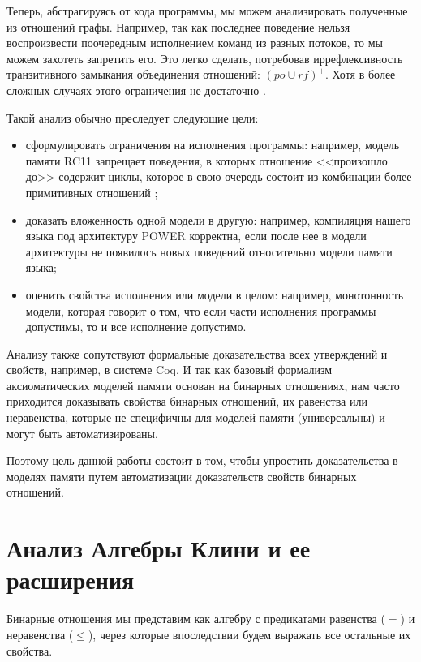 \documentclass[times
              ,specification
              ,annotation
              ]{itmo-student-thesis}
\begin{document}
  Теперь, абстрагируясь от кода программы, мы можем анализировать полученные из отношений
  графы. Например, так как последнее поведение нельзя воспроизвести поочередным исполнением команд из
  разных потоков, то мы можем захотеть запретить его.
  Это легко сделать, потребовав иррефлексивность транзитивного замыкания
  объединения отношений: $ (\textit{po} \cup \textit{rf})^+ $.
  Хотя в более сложных случаях этого ограничения не достаточно \cite{rc11}.

  Такой анализ обычно преследует следующие цели:
  \begin{itemize}
    \item сформулировать ограничения на исполнения программы:
    например, модель памяти RC11 запрещает поведения, в которых отношение <<произошло до>> содержит
    циклы, которое в свою очередь состоит из комбинации более примитивных отношений \cite{rc11};
    \item доказать вложенность одной модели в другую:
    например, компиляция нашего языка под архитектуру POWER корректна, если после нее в модели
    архитектуры \cite{axiomatic_memory_model_for_power_mp} не появилось новых поведений относительно
    модели памяти языка;
    \item оценить свойства исполнения или модели в целом:
    например, монотонность модели, которая говорит о том, что если части исполнения программы
    допустимы, то и все исполнение допустимо.
  \end{itemize}

  Анализу также сопутствуют формальные доказательства всех утверждений и свойств, например, в системе Coq.
  И так как базовый формализм аксиоматических моделей памяти основан на бинарных отношениях, нам часто
  приходится доказывать свойства бинарных отношений, их равенства или неравенства, которые не
  специфичны для моделей памяти (универсальны) и могут быть автоматизированы.

  Поэтому цель данной работы состоит в том, чтобы упростить доказательства в моделях памяти путем
  автоматизации доказательств свойств бинарных отношений.

  \section{Анализ Алгебры Клини и ее расширения}

    Бинарные отношения мы представим как алгебру с предикатами равенства ($ = $) и неравенства ($ \leq $),
    через которые впоследствии будем выражать все остальные их свойства.
\end{document}
